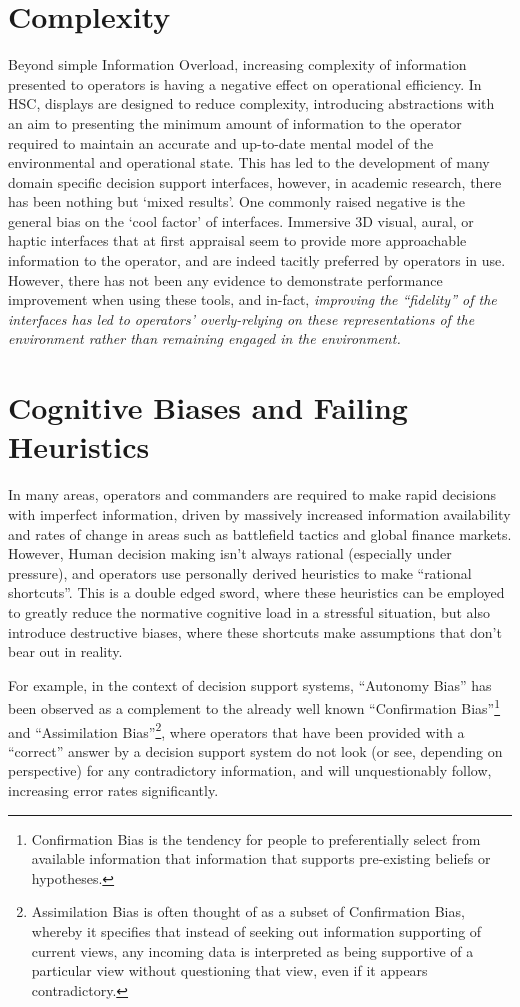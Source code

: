\section{Complexity}
Beyond simple Information Overload, increasing complexity of information presented to operators is having a negative effect on operational efficiency.
In HSC, displays are designed to reduce complexity, introducing abstractions with an aim to presenting the minimum amount of information to the operator required to maintain an accurate and up-to-date mental model of the environmental and operational state.
This has led to the development of many domain specific decision support interfaces, however, in academic research, there has been nothing but ‘mixed results’.
One commonly raised negative is the general bias on the ‘cool factor’ of interfaces.
Immersive 3D visual, aural, or haptic interfaces that at first appraisal seem to provide more approachable information to the operator, and are indeed tacitly preferred by operators in use.
However, there has not been any evidence to demonstrate performance improvement when using these tools, and in-fact, \textit{improving the ``fidelity'' of the interfaces has led to operators’ overly-relying on these representations of the environment rather than remaining engaged in the environment.}

\section{Cognitive Biases and Failing Heuristics}
In many areas, operators and commanders are required to make rapid decisions with imperfect information, driven by massively increased information availability and rates of change in areas such as battlefield tactics and global finance markets.
However, Human decision making isn’t always rational (especially under pressure), and operators use personally derived heuristics to make ``rational shortcuts''.
This is a double edged sword, where these heuristics can be employed to greatly reduce the normative cognitive load in a stressful situation, but also introduce destructive biases, where these shortcuts make assumptions that don’t bear out in reality.

For example, in the context of decision support systems, ``Autonomy Bias'' has been observed as a complement to the already well known ``Confirmation Bias''\footnote{Confirmation Bias is the tendency for people to preferentially select from available information that information that supports pre-existing beliefs or hypotheses.}  and ``Assimilation Bias''\footnote{Assimilation Bias is often thought of as a subset of Confirmation Bias, whereby it specifies that instead of seeking out information supporting of current views, any incoming data is interpreted as being supportive of a particular view without questioning that view, even if it appears contradictory.}, where operators that have been provided with a ``correct'' answer by a decision support system do not look (or see, depending on perspective) for any contradictory information, and will unquestionably follow, increasing error rates significantly.

